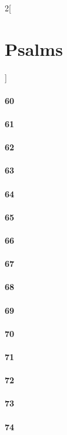 \documentclass{book}
\begin{document}
\begin{multicols}{2}[\part{Psalms}]
\subsection*{60}
\subsection*{61}
\subsection*{62}
\subsection*{63}
\subsection*{64}
\subsection*{65}
\subsection*{66}
\subsection*{67}
\subsection*{68}
\subsection*{69}
\subsection*{70}
\subsection*{71}
\subsection*{72}
\subsection*{73}
\subsection*{74}

\end{multicols}
\end{document}
